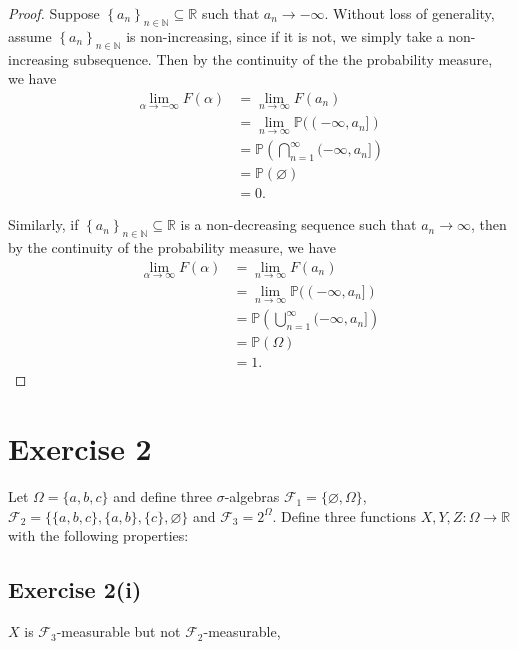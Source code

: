 \documentclass[12pt]{article}
\newenvironment{problem}
    {\begin{lrbox}{\mybox}\begin{minipage}{0.98\textwidth}}
    {\end{minipage}\end{lrbox}\framebox[\textwidth]{\usebox{\mybox}}}
\let\emptyset\varnothing %
\newcommand{\N}{\mathbb{N}} %
\newcommand{\R}{\mathbb{R}} %
\renewcommand{\P}{\mathbb{P}} %
\newcommand{\FF}{\mathcal{F}} %
\newcommand{\<}{\left\langle} %
\renewcommand{\>}{\right\rangle} %
\newcommand{\seq}[2][n]{\left\{#2\right\}_{#1\in\N}} %
\begin{document}
\begin{proof}
    Suppose $\seq{a_n}\subseteq\R$ such that $a_n\to-\infty$. Without loss of generality, assume $\seq{a_n}$ is non-increasing, since if it is not, we simply take a non-increasing subsequence. Then by the continuity of the the probability measure, we have
    \begin{align*}
        \lim_{\alpha\to-\infty}F(\alpha) 
            &= \lim_{n\to\infty}F(a_n) \\
            &= \lim_{n\to\infty}\P((-\infty,a_n]) \\
            &= \P\left(\bigcap_{n=1}^\infty(-\infty,a_n]\right) \\
            &= \P(\emptyset) \\
            &= 0.
    \end{align*}
    
    Similarly, if $\seq{a_n}\subseteq\R$ is a non-decreasing sequence such that $a_n\to\infty$, then by the continuity of the probability measure, we have
    \begin{align*}
        \lim_{\alpha\to\infty}F(\alpha) 
            &= \lim_{n\to\infty}F(a_n) \\
            &= \lim_{n\to\infty}\P((-\infty,a_n]) \\
            &= \P\left(\bigcup_{n=1}^\infty(-\infty,a_n]\right) \\
            &= \P(\Omega) \\
            &= 1.
    \end{align*}
    
\end{proof}

\newpage
\section*{Exercise 2}
\begin{problem}
    Let $\Omega = \{a,b,c\}$ and define three $\sigma$-algebras $\FF_1=\{\emptyset,\Omega\}$, $\FF_2=\{\{a,b,c\},\{a,b\},\{c\},\emptyset\}$ and $\FF_3 = 2^\Omega$. Define three functions $X,Y,Z:\Omega\to\R$ with the following properties:
\end{problem}

\subsection*{Exercise 2(i)}
\begin{problem}
    $X$ is $\FF_3$-measurable but not $\FF_2$-measurable,
\end{problem}
\medskip
\end{document}
